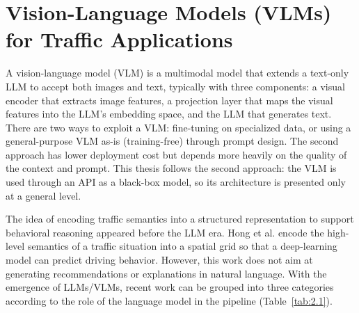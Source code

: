 \documentclass[12pt,a4paper]{report}
\begin{document}
\section{Vision-Language Models (VLMs) for Traffic Applications}

A vision-language model (VLM) is a multimodal model that extends a text-only LLM to accept both images and text, typically with three components: a visual encoder that extracts image features, a projection layer that maps the visual features into the LLM's embedding space, and the LLM that generates text. There are two ways to exploit a VLM: fine-tuning on specialized data, or using a general-purpose VLM as-is (training-free) through prompt design. The second approach has lower deployment cost but depends more heavily on the quality of the context and prompt. This thesis follows the second approach: the VLM is used through an API as a black-box model, so its architecture is presented only at a general level.

The idea of encoding traffic semantics into a structured representation to support behavioral reasoning appeared before the LLM era. Hong et al. \cite{hong2019rules} encode the high-level semantics of a traffic situation into a spatial grid so that a deep-learning model can predict driving behavior. However, this work does not aim at generating recommendations or explanations in natural language. With the emergence of LLMs/VLMs, recent work can be grouped into three categories according to the role of the language model in the pipeline (Table~\ref{tab:2.1}).
\end{document}
